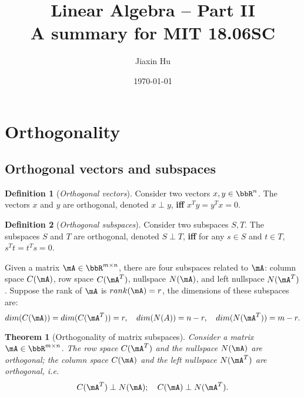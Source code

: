 \documentclass[11pt]{article}
\title{\textbf{Linear Algebra -- Part II}\\A summary for MIT 18.06SC}
\date{\today}
\author{%
Jiaxin Hu
}
\theoremstyle{plain}
\newtheorem{thm}{Theorem}[section]
\theoremstyle{definition}
\newtheorem{defn}{Definition}
\begin{document}

\maketitle


\section{Orthogonality}

\subsection{Orthogonal vectors and subspaces}
\begin{defn}[\textit{Orthogonal vectors}]\label{def:vortho}
	Consider two vectors $x,y \in \bbR^{n}$. The vectors $x$ and $y$ are orthogonal,  denoted $x \perp y$, \textbf{iff} $x^T y = y^T x = 0$.
\end{defn}

\begin{defn}[\textit{Orthogonal subspaces}]\label{def:sortho}
	Consider two subspaces $S,T$. The subspaces $S$ and $T$ are orthogonal,  denoted $S \perp T$, \textbf{iff} for any $s \in S$ and $ t \in T$, $s^T t = t^T s = 0$.
\end{defn}

Given a matrix $\mA \in \bbR^{m \times n}$, there are four subspaces related to $\mA$: column space $C(\mA)$, row space $C(\mA^T)$, nullspace $N(\mA)$, and left nullspace $N(\mA^T)$. Suppose the rank of $\mA$ is $rank(\mA) = r$, the dimensions of these subspaces are: 
\[ dim(C(\mA)) = dim(C(\mA^T)) = r,\quad  dim(N(A)) = n-r,\quad dim(N(\mA^T)) = m-r. \] 

\begin{thm}[Orthogonality of matrix subspaces]\label{thm:ortho}
	Consider a matrix $\mA \in \bbR^{m \times n}$. The row space $C(\mA^T)$ and the nullspace $N(\mA)$ are orthogonal; the column space $C(\mA)$ and the left nullspace $N(\mA^T)$ are orthogonal, i.e.\
	\[ C(\mA^T) \perp N(\mA); \quad C(\mA) \perp N(\mA^T).  \]
\end{thm}
\end{document}
